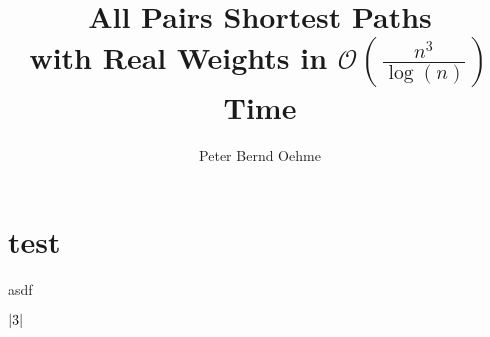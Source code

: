 

\usepackage{pdfpages}
\usepackage[a4paper, textwidth=15.75cm, textheight=23.4cm, marginratio={4:6,5:7}]{geometry}
\usepackage[english]{babel}
\usepackage{blindtext}

\title{All Pairs Shortest Paths \\ with Real Weights in $\mathcal{O}\left( \frac{n^3}{\log(n)} \right)$ Time}
\author{Peter Bernd Oehme}


    

    \tableofcontents
    \clearpage

    \section{test}

    asdf~\cite{Chan2007}

    $\left\lvert3\right\rvert_{}$

    \blindtext[25]
